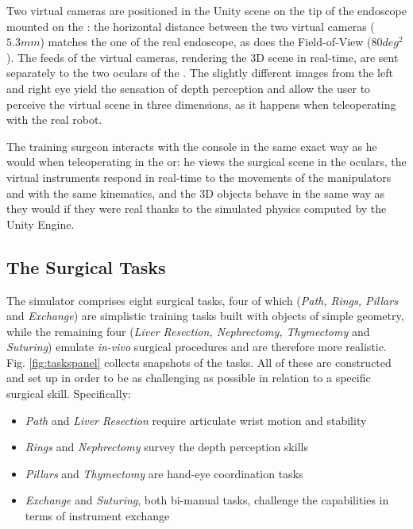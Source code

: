 \documentclass[../main.tex]{subfiles}
\begin{document}
Two virtual cameras are positioned in the Unity scene on the tip of the endoscope mounted on the \ecm: the horizontal distance between the two virtual cameras ($5.3 \unit{mm}$) matches the one of the real endoscope, as does the Field-of-View ($80 \unit{deg^2}$). The feeds of the virtual cameras, rendering the 3D scene in real-time, are sent separately to the two oculars of the \hrsv. The slightly different images from the left and right eye yield the sensation of depth perception and allow the user to perceive the virtual scene in three dimensions, as it happens when teleoperating with the real robot. 

The training surgeon interacts with the console in the same exact way as he would when teleoperating in the \ac{or}: he views the surgical scene in the oculars, the virtual instruments respond in real-time to the movements of the manipulators and with the same kinematics, and the 3D objects behave in the same way as they would if they were real thanks to the simulated physics computed by the Unity Engine.   

\subsection{The Surgical Tasks}
The simulator comprises eight surgical tasks, four of which (\textit{Path, Rings, Pillars} and \textit{Exchange}) are simplistic training tasks built with objects of simple geometry, while the remaining four (\textit{Liver Resection, Nephrectomy, Thymectomy} and \textit{Suturing}) emulate \textit{in-vivo} surgical procedures and are therefore more realistic. Fig. \ref{fig:taskspanel} collects snapshots of the tasks. All of these are constructed and set up in order to be as challenging as possible in relation to a specific surgical skill. Specifically:

\begin{itemize}
  \item \textit{Path} and \textit{Liver Resection} require articulate wrist motion and stability
  \item \textit{Rings} and \textit{Nephrectomy} survey the depth perception skills
  \item \textit{Pillars} and \textit{Thymectomy} are hand-eye coordination tasks
  \item \textit{Exchange} and \textit{Suturing}, both bi-manual tasks, challenge the capabilities in terms of instrument exchange 
\end{itemize}
\end{document}
